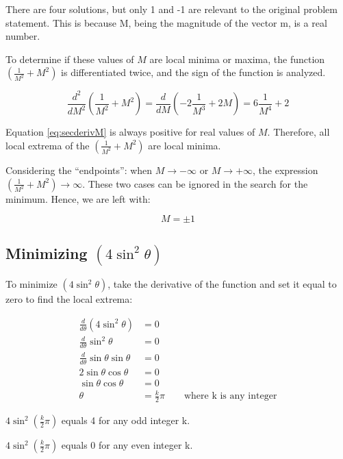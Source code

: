 \documentclass[11pt]{article}
\begin{document}
	There are four solutions, but only 1 and -1 are relevant to the original problem statement. This is because M, being the magnitude of the vector m, is a real number.
	
	To determine if these values of $M$ are local minima or maxima, the function $\left(\frac{1}{M^2} + M^2\right)$ is differentiated twice, and the sign of the function is analyzed.
	
	\begin{equation}
	\label{eq:secderivM}
	\frac{d^2}{dM^2}\left(\frac{1}{M^2} + M^2\right) = \frac{d}{dM}\left(-2\frac{1}{M^3} + 2M\right) = 6\frac{1}{M^4} + 2 
	\end{equation}
	
	Equation \ref{eq:secderivM} is always positive for real values of $M$. Therefore, all local extrema of the $\left(\frac{1}{M^2} + M^2\right)$ are local minima.
	
	Considering the \enquote{endpoints}: when $M \to-\infty$ or $M \to+\infty$, the expression $\left(\frac{1}{M^2} + M^2\right)\to\infty$. These two cases can be ignored in the search for the minimum. Hence, we are left with:
	
	\begin{equation}
		M = \pm1
	\end{equation}
	
	\subsection{Minimizing $\left(4\sin^2{\theta}\right)$}
	
	To minimize $\left(4\sin^2{\theta}\right)$, take the derivative of the function and set it equal to zero to find the local extrema:
	
	\begin{align*}
		\frac{d}{d\theta}\left(4\sin^2{\theta}\right) &= 0 \\
		\frac{d}{d\theta}\sin^2{\theta} &= 0 \\
		\frac{d}{d\theta}\sin{\theta}\sin{\theta} &= 0 \\
		2\sin{\theta}\cos{\theta} &= 0 \\
		\sin{\theta}\cos{\theta} &= 0 \\
		\theta &= \frac{k}{2}\pi \qquad\text{where k is any integer}
	\end{align*}
	
	$4\sin^2{\left(\frac{k}{2}\pi\right)}$ equals 4 for any odd integer k.
	
	$4\sin^2{\left(\frac{k}{2}\pi\right)}$ equals 0 for any even integer k.
	
\end{document}
